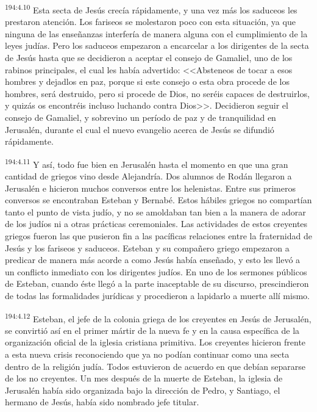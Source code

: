 \par 
\textsuperscript{194:4.10} Esta secta de Jesús crecía rápidamente, y una vez más los saduceos les prestaron atención. Los fariseos se molestaron poco con esta situación, ya que ninguna de las enseñanzas interfería de manera alguna con el cumplimiento de la leyes judías. Pero los saduceos empezaron a encarcelar a los dirigentes de la secta de Jesús hasta que se decidieron a aceptar el consejo de Gamaliel, uno de los rabinos principales, el cual les había advertido: <<Absteneos de tocar a esos hombres y dejadlos en paz, porque si este consejo o esta obra procede de los hombres, será destruido, pero si procede de Dios, no seréis capaces de destruirlos, y quizás os encontréis incluso luchando contra Dios>>. Decidieron seguir el consejo de Gamaliel, y sobrevino un período de paz y de tranquilidad en Jerusalén, durante el cual el nuevo evangelio acerca de Jesús se difundió rápidamente.

\par 
\textsuperscript{194:4.11} Y así, todo fue bien en Jerusalén hasta el momento en que una gran cantidad de griegos vino desde Alejandría. Dos alumnos de Rodán llegaron a Jerusalén e hicieron muchos conversos entre los helenistas. Entre sus primeros conversos se encontraban Esteban y Bernabé. Estos hábiles griegos no compartían tanto el punto de vista judío, y no se amoldaban tan bien a la manera de adorar de los judíos ni a otras prácticas ceremoniales. Las actividades de estos creyentes griegos fueron las que pusieron fin a las pacíficas relaciones entre la fraternidad de Jesús y los fariseos y saduceos. Esteban y su compañero griego empezaron a predicar de manera más acorde a como Jesús había enseñado, y esto les llevó a un conflicto inmediato con los dirigentes judíos. En uno de los sermones públicos de Esteban, cuando éste llegó a la parte inaceptable de su discurso, prescindieron de todas las formalidades jurídicas y procedieron a lapidarlo a muerte allí mismo.

\par 
\textsuperscript{194:4.12} Esteban, el jefe de la colonia griega de los creyentes en Jesús de Jerusalén, se convirtió así en el primer mártir de la nueva fe y en la causa específica de la organización oficial de la iglesia cristiana primitiva. Los creyentes hicieron frente a esta nueva crisis reconociendo que ya no podían continuar como una secta dentro de la religión judía. Todos estuvieron de acuerdo en que debían separarse de los no creyentes. Un mes después de la muerte de Esteban, la iglesia de Jerusalén había sido organizada bajo la dirección de Pedro, y Santiago, el hermano de Jesús, había sido nombrado jefe titular.


